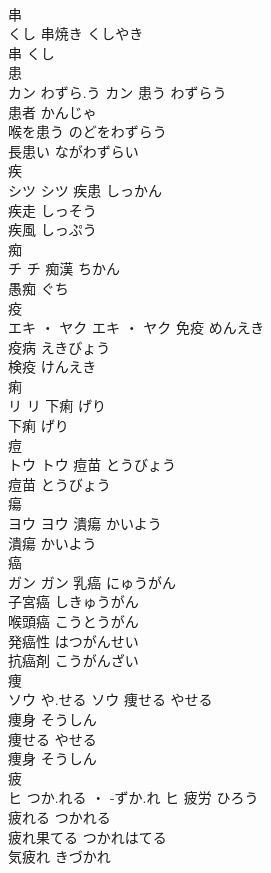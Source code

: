 \documentclass[8pt]{extreport}
\begin{document}
\begin{CJK}{UTF8}{min}
\\	串	
\\	くし		串焼き	くしやき	
\\	串	くし	
\\	患	
\\	カン	わずら.う	カン	患う	わずらう	
\\	患者	かんじゃ	
\\	喉を患う	のどをわずらう	
\\	長患い	ながわずらい	
\\	疾	
\\	シツ		シツ	疾患	しっかん	
\\	疾走	しっそう	
\\	疾風	しっぷう	
\\	痴	
\\	チ		チ	痴漢	ちかん	
\\	愚痴	ぐち	
\\	疫	
\\	エキ ・ ヤク		エキ ・ ヤク	免疫	めんえき	
\\	疫病	えきびょう	
\\	検疫	けんえき	
\\	痢	
\\	リ		リ	下痢	げり	
\\	下痢	げり	
\\	痘	
\\	トウ		トウ	痘苗	とうびょう	
\\	痘苗	とうびょう	
\\	瘍	
\\	ヨウ		ヨウ	潰瘍	かいよう	
\\	潰瘍	かいよう	
\\	癌	
\\	ガン		ガン	乳癌	にゅうがん	
\\	子宮癌	しきゅうがん	
\\	喉頭癌	こうとうがん	
\\	発癌性	はつがんせい	
\\	抗癌剤	こうがんざい	
\\	痩	
\\	ソウ	や.せる	ソウ	痩せる	やせる	
\\	痩身	そうしん	
\\	痩せる	やせる	
\\	痩身	そうしん	
\\	疲	
\\	ヒ	つか.れる ・ -ずか.れ	ヒ	疲労	ひろう	
\\	疲れる	つかれる	
\\	疲れ果てる	つかれはてる	
\\	気疲れ	きづかれ	

\end{CJK}
\end{document}
